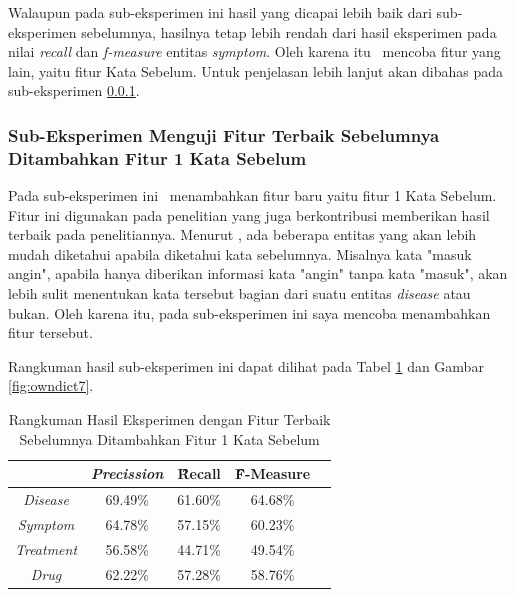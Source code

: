 	Walaupun pada sub-eksperimen ini hasil yang dicapai lebih baik dari sub-eksperimen sebelumnya, hasilnya tetap lebih rendah dari hasil eksperimen \cite{skripsiKakRadit} pada nilai \textit{recall} dan \textit{f-measure} entitas \textit{symptom}. Oleh karena itu \saya~mencoba fitur yang lain, yaitu fitur Kata Sebelum. Untuk penjelasan lebih lanjut akan dibahas pada sub-eksperimen \ref{eks:subekswbef1}.
	
	\subsubsection{Sub-Eksperimen Menguji Fitur Terbaik Sebelumnya Ditambahkan Fitur 1 Kata Sebelum}\label{eks:subekswbef1}
	Pada sub-eksperimen ini \saya~menambahkan fitur baru yaitu fitur 1 Kata Sebelum. Fitur ini digunakan pada penelitian \cite{skripsiKakRadit} yang juga berkontribusi memberikan hasil terbaik pada penelitiannya. Menurut \saya, ada beberapa entitas yang akan lebih mudah diketahui apabila diketahui kata sebelumnya. Misalnya kata "masuk angin", apabila hanya diberikan informasi kata "angin" tanpa kata "masuk", akan lebih sulit menentukan kata tersebut bagian dari suatu entitas \textit{disease} atau bukan. Oleh karena itu, pada sub-eksperimen ini saya mencoba menambahkan fitur tersebut.
	
	Rangkuman hasil sub-eksperimen ini dapat dilihat pada Tabel \ref{table:owndict7} dan Gambar \ref{fig:owndict7}.
	
	\begin{table}
		\centering
		\caption{Rangkuman Hasil Eksperimen dengan Fitur Terbaik Sebelumnya Ditambahkan Fitur 1 Kata Sebelum}
		\begin{tabular}{|c|c|c|c|c|}
			\hline
		                          & \textit{Precission} & \f{\f{Recall}} & \f{\f{F-Measure}} \\ \hline
			\textit{Disease}      & 69.49\%             & 61.60\%        & 64.68\%           \\ \hline
			\textit{Symptom}      & 64.78\%             & 57.15\%        & 60.23\%           \\ \hline
			\textit{Treatment}    & 56.58\%             & 44.71\%        & 49.54\%           \\ \hline
			\textit{Drug}		  & 62.22\%             & 57.28\%        & 58.76\%           \\ \hline
		\end{tabular}
		\label{table:owndict7}
	\end{table}
	
